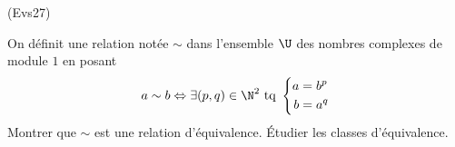 \begin{tiny}(Evs27)\end{tiny} On définit une relation notée $\sim$ dans l'ensemble $\U$ des nombres complexes de module $1$ en posant
\begin{displaymath}
  a \sim b \Leftrightarrow \exists(p,q)\in \N^2 \text{ tq }
  \left\lbrace 
  \begin{aligned}
    a &= b ^p \\ b &= a^q 
  \end{aligned}
\right. 
\end{displaymath}
Montrer que $\sim$ est une relation d'équivalence. \'Etudier les classes d'équivalence.
